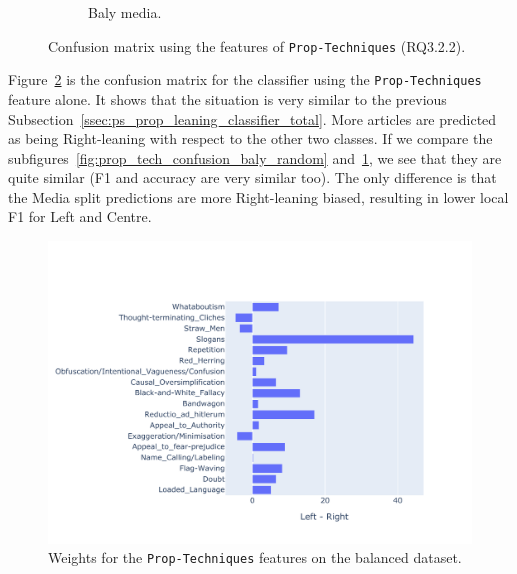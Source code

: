 \begin{figure}[!htbp]
\begin{subfigure}[b]{0.48\linewidth}
         \caption{Baly media.}
         \label{fig:prop_tech_confusion_baly_media}
     \end{subfigure}
    \caption{Confusion matrix using the features of \texttt{Prop-Techniques} (RQ3.2.2).}
    \label{fig:prop_tech_confusion}
\end{figure}


Figure~\ref{fig:prop_tech_confusion} is the confusion matrix for the classifier using the \texttt{Prop-Techniques} feature alone. It shows that the situation is very similar to the previous Subsection~\ref{ssec:ps_prop_leaning_classifier_total}. More articles are predicted as being Right-leaning with respect to the other two classes. %
If we compare the subfigures~\ref{fig:prop_tech_confusion_baly_random} and~\ref{fig:prop_tech_confusion_baly_media}, we see that they are quite similar (F1 and accuracy are very similar too). The only difference is that the Media split predictions are more Right-leaning biased, resulting in lower local F1 for Left and Centre.


\begin{figure}[!htbp]
    \centering
    \includegraphics[trim={0cm 0.9cm 2cm 2.5cm},clip,width=\linewidth]{figures/nodes_stratifiedbalanced_weights_propaganda_percentages-small-simple.pdf}
    \caption{Weights for the \texttt{Prop-Techniques} features on the balanced dataset.}
    \label{fig:prop_tech_weights}
\end{figure}

